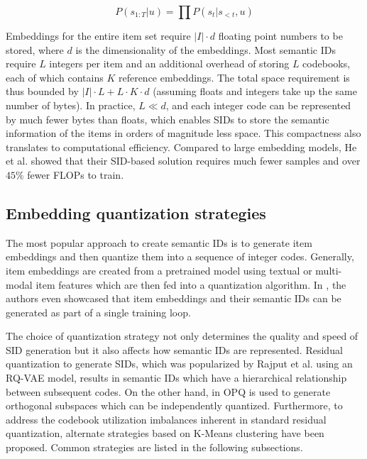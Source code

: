 \documentclass[11pt,a4paper]{article}
\begin{document}
\begin{equation} \label{eq:SIDGenRec}
P (s_{1:T} | u) = \prod P(s_t | s_{<t}, u)
\end{equation}

Embeddings for the entire item set require $|I| \cdot d$ floating point numbers to be stored, where $d$ is the dimensionality of the embeddings. Most semantic IDs require $L$ integers per item and an additional overhead of storing $L$ codebooks, each of which contains $K$ reference embeddings. The total space requirement is thus bounded by $|I| \cdot L + L \cdot K \cdot d$ (assuming floats and integers take up the same number of bytes). In practice, $L \ll d$, and each integer code can be represented by much fewer bytes than floats, which enables SIDs to store the semantic information of the items in orders of magnitude less space. This compactness also translates to computational efficiency. Compared to large embedding models, He et al. \cite{2025PLUM_he2025plumadaptingpretrainedlanguage} showed that their SID-based solution requires much fewer samples and over $45\%$ fewer FLOPs to train.

\subsection{Embedding quantization strategies}\label{subsection:Quantization}
The most popular approach to create semantic IDs is to generate item embeddings and then quantize them into a sequence of integer codes. Generally, item embeddings are created from a pretrained model using textual or multi-modal item features which are then fed into a quantization algorithm. In \cite{2026UniSID_jiang2026endtoendsemanticidgeneration}, the authors even showcased that item embeddings and their semantic IDs can be generated as part of a single training loop.

The choice of quantization strategy not only determines the quality and speed of SID generation but it also affects how semantic IDs are represented. Residual quantization to generate SIDs, which was popularized by Rajput
et al. \cite{2023TIGER_rajput2023recommendersystemsgenerativeretrieval} using an RQ-VAE \cite{RQVAE_lee2022autoregressiveimagegenerationusing} model, results in semantic IDs which have a hierarchical relationship between subsequent codes. On the other hand, in \cite{2025RPG_hou2025generatinglongsemanticids, 2026ACERec_xia2026unleashpotentiallongsemantic} OPQ \cite{OPQ} is used to generate orthogonal subspaces which can be independently quantized. Furthermore, to address the codebook utilization imbalances inherent in standard residual quantization, alternate strategies based on K-Means clustering have been proposed. Common strategies are listed in the following subsections.
\end{document}
